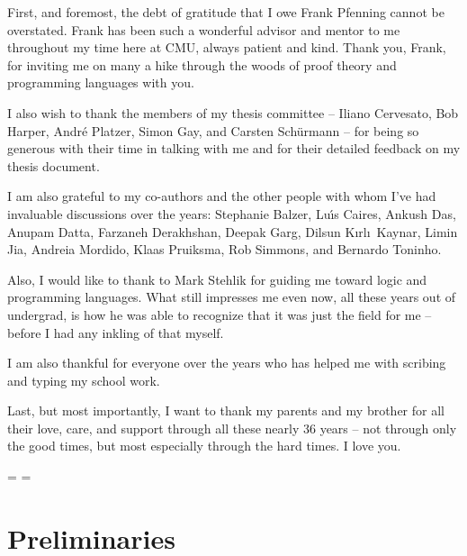 \documentclass[
  tufte-book,
  notoc,
  symmetric,
  biblatex={
    citestyle=authoryear-comp,
    autocite=footnote,
    maxcitenames=2,
    bibstyle=authoryear,
    dashed=false,
    mergedate=basic,
    maxbibnames=99,
    backref=true,
    doi=false,
    url=false,
    isbn=false,
  }
]{tufte-thesis}
\begin{document}
\begin{acknowledgments}
  \normalsize
  First, and foremost, the debt of gratitude that I owe Frank Pfenning cannot be overstated.
  Frank has been such a wonderful advisor and mentor to me throughout my time here at CMU, always patient and kind.
  Thank you, Frank, for inviting me on many a hike through the woods of proof theory and programming languages with you.

  I also wish to thank the members of my thesis committee -- Iliano Cervesato, Bob Harper, Andr\'{e} Platzer, Simon Gay, and Carsten Sch\"{u}rmann -- for being so generous with their time in talking with me and for their detailed feedback on my thesis document.  

  I am also grateful to my co-authors and the other people with whom I've had invaluable discussions over the years:
  Stephanie Balzer, Lu\'{\i}s Caires, Ankush Das, Anupam Datta, Farzaneh Derakhshan, Deepak Garg, Dilsun K\i rl\i\ Kaynar, Limin Jia, Andreia Mordido, Klaas Pruiksma, Rob Simmons, and Bernardo Toninho.

  Also, I would like to thank to Mark Stehlik for guiding me toward logic and programming languages.
  What still impresses me even now, all these years out of undergrad, is how he was able to recognize that it was just the field for me -- before I had any inkling of that myself.

  I am also thankful for everyone over the years who has helped me with scribing and typing my school work.

  Last, but most importantly, I want to thank my parents and my brother for all their love, care, and support through all these nearly 36 years -- not through only the good times, but most especially through the hard times.
  I love you.
\end{acknowledgments}

\oddsidemargin=\saveoddsidemargin
\evensidemargin=\saveevensidemargin

\tableofcontents

\mainmatter




\part{Preliminaries}\label{part:preliminaries}



\end{document}
